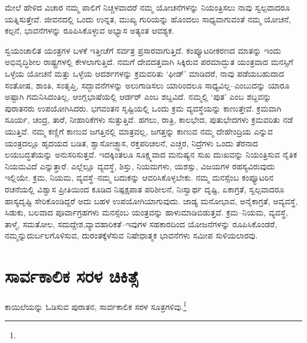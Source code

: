 ಮೇಲೆ ಹೇಳಿದ ವಿಚಾರ ನಮ್ಮ ಪಾಲಿಗೆ ನಿಚ್ಚಳವಾದರೆ ನಮ್ಮ ಯೋಚನೆಗಳನ್ನು ನಿಯಂತ್ರಿಸಲು ನಾವು ಸ್ವಲ್ಪವಾದರೂ ಯತ್ನಿಸುತ್ತೇವೆ. ಜೀವನದಲ್ಲಿ ಒಂದು ಉನ್ನತ, ಮುಖ್ಯ ಗುರಿಯನ್ನು ಹೊಂದಲು ಸಾಧ್ಯವಾಗುವಂತೆ ನಮ್ಮ ಯೋಚನೆ, ಕಲ್ಪನೆ, ಭಾವನೆಗಳನ್ನು ರೂಪಿಸಿಕೊಳ್ಳುವ ಅಭ್ಯಾಸ ಅತ್ಯಂತ ಆವಶ್ಯಕ.

ಸ್ವಯಂಚಾಲಿತ ಯಂತ್ರಗಳ ಬಳಕೆ ಇತ್ತೀಚೆಗೆ ಸರ್ವತ್ರ ಪ್ರಸಾರವಾಗುತ್ತಿದೆ. ಕಂಪ್ಯೂಟರೀ\-ಕರಣದ ಮಾತನ್ನು ಇಂದು ಅಭಿವೃದ್ಧಿಶೀಲ ರಾಷ್ಟ್ರಗಳಲ್ಲಿ ಕೇಳಲಾಗುತ್ತಿದೆ. ನಮಗೆ ದೇವದತ್ತವಾಗಿ ಸಿಕ್ಕಿರುವ ಪರಮಾದ್ಭುತ ಯಂತ್ರವಾದ ಮನಸ್ಸಿಗೆ ಒಳ್ಳೆಯ ಯೋಚನೆ ಮತ್ತು ಒಳ್ಳೆಯ ಆದರ್ಶಗಳನ್ನು ಕ್ರಮವರಿತು ‘ಫೀಡ್​’ ಮಾಡಿದರೆ, ನಾವು ಪಡೆಯಬಹುದಾದ ಸಂತೋಷ, ಶಾಂತಿ, ಸಂತೃಪ್ತಿ, ಸದ್ಭಾವನೆಗಳನ್ನು ಅಲುಗಾಡಿಸಲು ಯಾರಿಂದಲೂ ಸಾಧ್ಯವಿಲ್ಲ–ಎಂಬುದನ್ನು ಯಾರೂ ಅಷ್ಟಾಗಿ ಗಮನಿಸಿದಂತಿಲ್ಲ. ಆಂಗ್ಲಭಾಷೆಯಲ್ಲಿ ಆರ್ಡರ್  ಎಂಬ ಶಬ್ದವಿದೆ. ನಮ್ಮಲ್ಲಿ ‘ಪುತ’ ಎಂಬ ಶಬ್ದವನ್ನು ಪುರಾತನರು ಉಪಯೋಗಿಸಿದರು. ಭಗವಂತನ ಸೃಷ್ಟಿಯಲ್ಲಿ ಒಂದು ಕ್ರಮ ವ್ಯವಸ್ಥೆಯನ್ನು ಕಾಣುತ್ತೇವೆ. ಕ್ರಮವಾಗಿ ಸೂರ್ಯ, ಚಂದ್ರ, ತಾರೆ, ನೀಹಾರಿಕೆಗಳು ಸುತ್ತುತ್ತಿವೆ. ಹಗಲು, ರಾತ್ರಿ, ಕಾಲಭೇದ, ಪುತುಭೇದಗಳು ಕ್ರಮವರಿತು ನಡೆ ಯುತ್ತಿವೆ. ನಮ್ಮ ಕಣ್ಣಿಗೆ ಕಾಣುವ ಜಗತ್ತಿನಲ್ಲಿ ಮಾತ್ರವಲ್ಲ, ಜಗತ್ತನ್ನು ಕಾಣುವ ನಮ್ಮ ದೇಹೇಂದ್ರಿಯ ಎನ್ನುವ ಯಂತ್ರದಲ್ಲೂ ಹೃದಯದ ಬಡಿತ, ಶ್ವಾಸೋಚ್ಛ್ವಾಸ, ರಕ್ತಪರಿಚಲನೆ, ಎಚ್ಚರ, ನಿದ್ರೆಗಳು ಒಂದು ತೆರನಾದ ಲಯಬದ್ಧತೆಯನ್ನು ಅನುಸರಿಸುತ್ತವೆ. ಇದಕ್ಕಿಂತಲೂ ಸೂಕ್ಷ್ಮವಾದ ಮನುಷ್ಯನ ಸುಖ ದುಃಖವನ್ನು ನಿಯಂತ್ರಿಸುವ ನೈತಿಕ ನಿಯಮವಿದೆ ಎನ್ನುತ್ತಾರೆ. ಎಲ್ಲೆಲ್ಲೂ ವ್ಯವಸ್ಥೆ, ಶಿಸ್ತು, ನಿಯಮಗಳು, ಯಶಸ್ಸು, ವಿಜಯಗಳ ರಹಸ್ಯವಿರುವುದು ಇಲ್ಲಿಯೇ. ಕ್ರಮ, ನಿಯಮ, ವ್ಯವಸ್ಥೆ–ನಮ್ಮ ಬದುಕನ್ನು ಆವರಿಸಿಕೊಳ್ಳಬೇಕು. ನಮ್ಮ ಮನಸ್ಸೆಂಬ ಕಂಪ್ಯೂಟರಿನ ರಚನೆಯಲ್ಲಿ ವಿಶ್ವಾಸ ಪ್ರೀತಿಯಿಂದ ಕೂಡಿದ ನಿಷ್ಪಕ್ಷಪಾತ ಪರಿಶೀಲನೆ, ನಿಃಸ್ವಾರ್ಥ ದೃಷ್ಟಿ, ಏಕಾಗ್ರತೆ, ಸ್ವಲ್ಪವಾದರೂ ಹಾಸ್ಯದೃಷ್ಟಿ ಸೇರಿಕೊಂಡಿದ್ದರೆ ಅದು ಬಹಳ ಉಪಯೋಗಿಯಾಗುವುದು. ಜಾಡ್ಯ ಮನೋಭಾವ, ಅನೈಕಾಗ್ರತೆ, ಅವ್ಯವಸ್ಥೆ, ಸಿಡುಕು, ಬಲವಾದ ಪೂರ್ವಾಗ್ರಹಗಳು ಮನಸ್ಸೆಂಬ ಯಂತ್ರವನ್ನು ಹಾಳುಮಾಡಿಬಿಡುತ್ತವೆ. ಕ್ರಮ–ನಿಯಮ, ವ್ಯವಸ್ಥೆ, ತಾಳ್ಮೆ, ಸಮತೋಲ, ಸದುದ್ದೇಶ,\break ವ್ಯಾವಹಾರಿಕತೆ–ಇವುಗಳ ಸಹಕಾರದಿಂದ ಯೋಜನೆಗಳನ್ನು ರೂಪಿಸಿಕೊಂಡರೆ, ನಮ್ಮನ್ನು\break ದುರ್ಬಲ\-ಗೊಳಿಸುವ, ದುರಂತಕ್ಕೆಳೆಸುವ ನಿಷೇಧಾತ್ಮಕ ಭಾವನೆಗಳು ಸಮೀಪ ಸುಳಿಯಲಾರವು.


\section*{ಸಾರ್ವಕಾಲಿಕ ಸರಳ ಚಿಕಿತ್ಸೆ}


ಕಾಯಿಲೆಯನ್ನು ಓಡಿಸುವ ಪುರಾತನ, ಸಾರ್ವಕಾಲಿಕ ಸರಳ ಸೂತ್ರಗಳಿವು.\footnote{}

